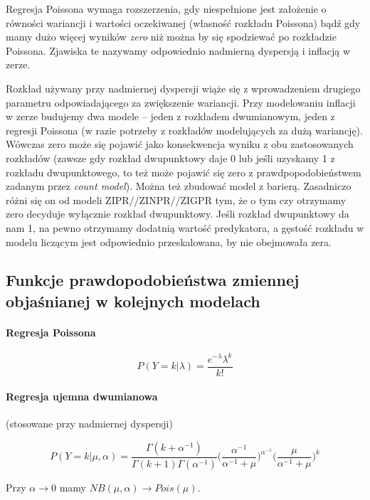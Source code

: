\documentclass[a4paper,11pt]{article}
\begin{document}
Regresja Poissona wymaga rozszerzenia, gdy niespełnione jest założenie o równości wariancji i wartości oczekiwanej (własność rozkładu Poissona) bądź gdy mamy dużo więcej wyników \textit{zero} niż można by się spodziewać po rozkładzie Poissona. Zjawiska te nazywamy odpowiednio nadmierną dyspersją i inflacją w zerze. 

Rozkład używany przy nadmiernej dyspersji wiąże się z wprowadzeniem drugiego  parametru odpowiadającego za zwiększenie wariancji.  Przy modelowaniu inflacji  w zerze budujemy dwa modele --  jeden z rozkładem dwumianowym, jeden z regresji Poissona (w  razie potrzeby z rozkładów modelujących za dużą wariancję).  Wówczas zero może się pojawić jako konsekwencja wyniku z obu zastosowanych rozkładów  (zawsze gdy rozkład dwupunktowy daje 0 lub jeśli uzyskamy 1 z rozkładu dwupunktowego,  to też może pojawić się zero z prawdpopodobieństwem zadanym przez \textit{count model}). Można też zbudować model z barierą. Zasadniczo różni się on od modeli ZIPR//ZINPR//ZIGPR  tym, że o tym czy otrzymamy zero decyduje wyłącznie rozkład dwupunktowy. Jeśli rozkład dwupunktowy da nam 1, na pewno otrzymamy dodatnią wartość predykatora, a gęstość rozkładu w modelu liczącym jest odpowiednio przeskalowana, by nie obejmowała zera.  

\subsection{Funkcje prawdopodobieństwa zmiennej objaśnianej w kolejnych modelach}



\paragraph{Regresja Poissona}

$$P(Y=k|\lambda) = \frac{e^{-\lambda} \lambda^{k}}{k!} $$ 

\paragraph{Regresja ujemna dwumianowa} (stosowane przy nadmiernej dyspersji)

$$ P(Y=k|\mu, \alpha) = \frac{\Gamma(k+ \alpha^{-1})}{\Gamma(k+1)\Gamma(\alpha^{-1})} \Bigg( \frac{\alpha^{-1}}{\alpha^{-1}+\mu} \Bigg)^{\alpha^{-1}} \Bigg( \frac{\mu}{\alpha^{-1}  + \mu}  \Bigg)^{k} $$

Przy $\alpha \rightarrow 0 $ mamy $NB(\mu, \alpha) \rightarrow Pois(\mu)$. 
\end{document}
